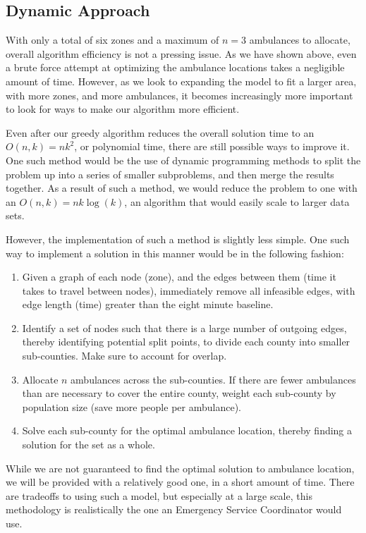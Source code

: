 \documentclass[notitlepage, 12pt]{article}
\begin{document}
\subsection{Dynamic Approach}
With only a total of six zones and a maximum of $n = 3$ ambulances to allocate, overall algorithm efficiency is
not a pressing issue. As we have shown above, even a brute force attempt at optimizing the ambulance locations
takes a negligible amount of time. However, as we look to expanding the model to fit a larger area, with more
zones, and more ambulances, it becomes increasingly more important to look for ways to make our algorithm more efficient.

Even after our greedy algorithm reduces the overall solution time to an $O(n, k) = nk^2$, or polynomial time, there
are still possible ways to improve it. One such method would be the use of dynamic programming methods to split the
problem up into a series of smaller subproblems, and then merge the results together. As a result of such a method,
we would reduce the problem to one with an $O(n, k) = nk\log(k)$, an algorithm that would easily scale to larger data sets.

However, the implementation of such a method is slightly less simple.
One such way to implement a solution in this manner would be in the following fashion:

\begin{enumerate}
\item Given a graph of each node (zone), and the edges between them (time it takes to travel between nodes),
    immediately remove all infeasible edges, with edge length (time) greater than the eight minute baseline.

\item Identify a set of nodes such that there is a large number of outgoing edges, thereby identifying potential
    split points, to divide each county into smaller sub-counties. Make sure to account for overlap.

\item Allocate $n$ ambulances across the sub-counties. If there are fewer ambulances than are necessary to cover
    the entire county, weight each sub-county by population size (save more people per ambulance).

\item Solve each sub-county for the optimal ambulance location, thereby finding a solution for the set as a whole.
\end{enumerate}

While we are not guaranteed to find the optimal solution to ambulance location, we will be provided with a relatively
good one, in a short amount of time. There are tradeoffs to using such a model, but especially at a large scale,
this methodology is realistically the one an Emergency Service Coordinator would use.
\end{document}
